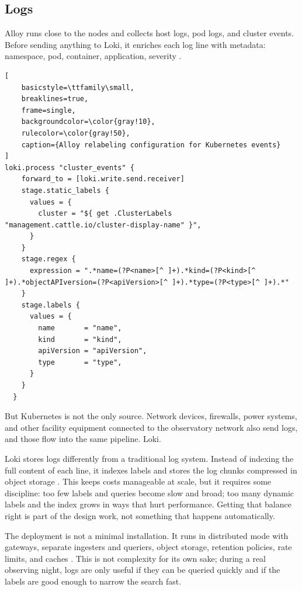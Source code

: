 \subsection{Logs}

Alloy runs close to the nodes and collects host logs, pod logs, and cluster events. Before sending
anything to Loki, it enriches each log line with metadata: namespace, pod, container, application,
severity \cite{lsst-it-k8s-cookbook,grafana-loki-alloy}. 

\begin{lstlisting}[
    basicstyle=\ttfamily\small,
    breaklines=true,
    frame=single,
    backgroundcolor=\color{gray!10},
    rulecolor=\color{gray!50},
    caption={Alloy relabeling configuration for Kubernetes events}
]
loki.process "cluster_events" {
    forward_to = [loki.write.send.receiver]
    stage.static_labels {
      values = {
        cluster = "${ get .ClusterLabels "management.cattle.io/cluster-display-name" }",
      }
    }
    stage.regex {
      expression = ".*name=(?P<name>[^ ]+).*kind=(?P<kind>[^ ]+).*objectAPIversion=(?P<apiVersion>[^ ]+).*type=(?P<type>[^ ]+).*"
    }
    stage.labels {
      values = {
        name       = "name",
        kind       = "kind",
        apiVersion = "apiVersion",
        type       = "type",
      }
    }
  }
\end{lstlisting}

But Kubernetes is not the only source.
Network devices, firewalls, power systems, and other facility equipment connected to the observatory
network also send logs, and those flow into the same pipeline. Loki. 

Loki stores logs differently from a traditional log system. Instead of indexing the full content
of each line, it indexes labels and stores the log chunks compressed in object storage
\cite{grafana-loki}. This keeps costs manageable at scale, but it requires some discipline: too
few labels and queries become slow and broad; too many dynamic labels and the index grows in ways
that hurt performance. Getting that balance right is part of the design work, not something that
happens automatically.

The deployment is not a minimal installation. It runs in distributed mode with gateways, separate
ingesters and queriers, object storage, retention policies, rate limits, and caches
\cite{lsst-it-k8s-cookbook}. This is not complexity for its own sake; during a real observing
night, logs are only useful if they can be queried quickly and if the labels are good enough to
narrow the search fast.

